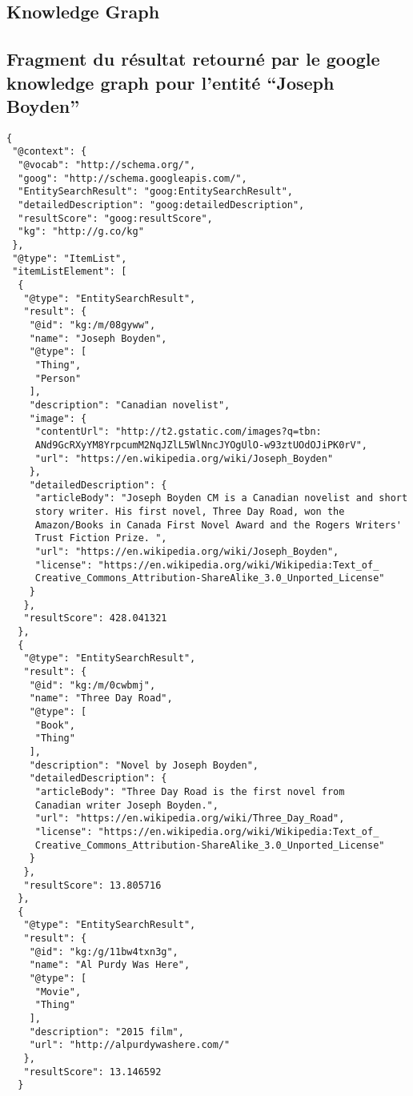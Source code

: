 \begin{appendices}

\section{Knowledge Graph}
\subsection{Fragment du résultat retourné par le google knowledge graph pour l'entité \enquote{Joseph Boyden}}
\label{appendix:gkg_jb}

\begin{lstlisting}
{
 "@context": {
  "@vocab": "http://schema.org/",
  "goog": "http://schema.googleapis.com/",
  "EntitySearchResult": "goog:EntitySearchResult",
  "detailedDescription": "goog:detailedDescription",
  "resultScore": "goog:resultScore",
  "kg": "http://g.co/kg"
 },
 "@type": "ItemList",
 "itemListElement": [
  {
   "@type": "EntitySearchResult",
   "result": {
    "@id": "kg:/m/08gyww",
    "name": "Joseph Boyden",
    "@type": [
     "Thing",
     "Person"
    ],
    "description": "Canadian novelist",
    "image": {
     "contentUrl": "http://t2.gstatic.com/images?q=tbn:
     ANd9GcRXyYM8YrpcumM2NqJZlL5WlNncJYOgUlO-w93ztUOdOJiPK0rV",
     "url": "https://en.wikipedia.org/wiki/Joseph_Boyden"
    },
    "detailedDescription": {
     "articleBody": "Joseph Boyden CM is a Canadian novelist and short 
     story writer. His first novel, Three Day Road, won the 
     Amazon/Books in Canada First Novel Award and the Rogers Writers' 
     Trust Fiction Prize. ",
     "url": "https://en.wikipedia.org/wiki/Joseph_Boyden",
     "license": "https://en.wikipedia.org/wiki/Wikipedia:Text_of_
     Creative_Commons_Attribution-ShareAlike_3.0_Unported_License"
    }
   },
   "resultScore": 428.041321
  },
  {
   "@type": "EntitySearchResult",
   "result": {
    "@id": "kg:/m/0cwbmj",
    "name": "Three Day Road",
    "@type": [
     "Book",
     "Thing"
    ],
    "description": "Novel by Joseph Boyden",
    "detailedDescription": {
     "articleBody": "Three Day Road is the first novel from 
     Canadian writer Joseph Boyden.",
     "url": "https://en.wikipedia.org/wiki/Three_Day_Road",
     "license": "https://en.wikipedia.org/wiki/Wikipedia:Text_of_
     Creative_Commons_Attribution-ShareAlike_3.0_Unported_License"
    }
   },
   "resultScore": 13.805716
  },
  {
   "@type": "EntitySearchResult",
   "result": {
    "@id": "kg:/g/11bw4txn3g",
    "name": "Al Purdy Was Here",
    "@type": [
     "Movie",
     "Thing"
    ],
    "description": "2015 film",
    "url": "http://alpurdywashere.com/"
   },
   "resultScore": 13.146592
  }
\end{lstlisting}


\end{appendices}

